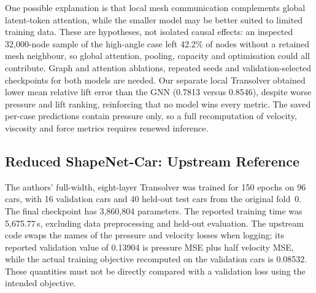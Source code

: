 \documentclass[journal]{IEEEtran}
\begin{document}
\begin{table}[t]
\centering
\caption{Paper-shaped metrics with explicitly defined retrospective relative
$L_2$ aggregation; not directly comparable to published scores.}
\label{tab:airfrans_l2}
\end{table}

One possible explanation is that local mesh communication complements global
latent-token attention, while the smaller model may be better suited to limited
training data. These are hypotheses, not isolated causal effects: an inspected
32{,}000-node sample of the high-angle case left 42.2\% of nodes without a
retained mesh neighbour, so global attention, pooling, capacity and optimisation
could all contribute. Graph and attention ablations, repeated seeds and
validation-selected checkpoints for both models are needed. Our separate local
Transolver obtained lower mean relative lift error than the GNN (0.7813 versus
0.8546), despite worse pressure and lift ranking, reinforcing that no model wins
every metric. The saved per-case predictions contain pressure only, so a full
recomputation of velocity, viscosity and force metrics requires renewed inference.

\subsection{Reduced ShapeNet-Car: Upstream Reference}
The authors' full-width, eight-layer Transolver was trained for 150 epochs on
96 cars, with 16 validation cars and 40 held-out test cars from the original
fold~0. The final checkpoint has 3,860,804 parameters. The reported training
time was 5,675.77\,s, excluding data preprocessing and held-out evaluation.
The upstream code swaps the names of the pressure and velocity losses when
logging; its reported validation value of 0.13904 is pressure MSE plus half
velocity MSE, while the actual training objective recomputed on the validation
cars is 0.08532. These quantities must not be directly compared with a
validation loss using the intended objective.
\end{document}

